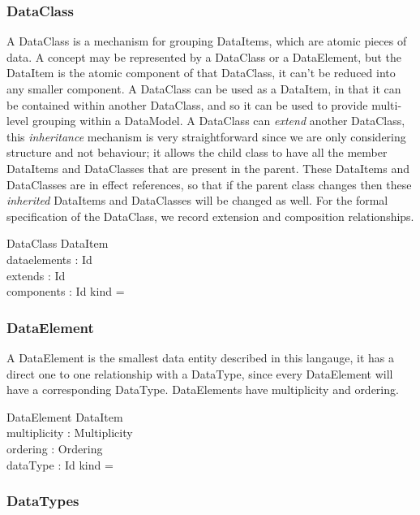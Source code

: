 \documentclass{llncs}
\def\dataclass{\mathsf{dataclass}}
\def\dataelement{\mathsf{dataelement}}
\begin{document}
\subsubsection{DataClass}
A DataClass is a mechanism for grouping DataItems, which are atomic pieces of data. A concept may be represented by a DataClass or a DataElement, but the DataItem is the atomic component of that DataClass, it can't be reduced into any smaller component. A DataClass can be used as a DataItem, in that it can be contained within another DataClass, and so it can be used to provide multi-level grouping within a DataModel. A DataClass can \emph{extend} another DataClass, this \emph{inheritance} mechanism is very straightforward since we are only considering structure and not behaviour; it allows the child class to have all the member DataItems and DataClasses that are present in the parent. These DataItems and DataClasses are in effect references, so that if the parent class changes then these \emph{inherited} DataItems and DataClasses will be changed as well.
For the formal specification of the DataClass, we record extension and composition relationships.

\begin{schema}{DataClass}
  DataItem \\
  dataelements : \power Id \\
  extends : \power Id \\
  components : \power Id 
  \where
  kind = \dataclass
\end{schema}

\subsubsection{DataElement}

A DataElement is the smallest data entity described in this langauge, it has a direct one to one relationship with a DataType, since every DataElement will have a corresponding DataType. DataElements have multiplicity and ordering. 

\begin{schema}{DataElement}
  DataItem \\
  multiplicity : Multiplicity \\
  ordering : Ordering \\
  dataType : Id 
  \where
  kind = \dataelement
\end{schema}

\subsubsection{DataTypes}
\end{document}

